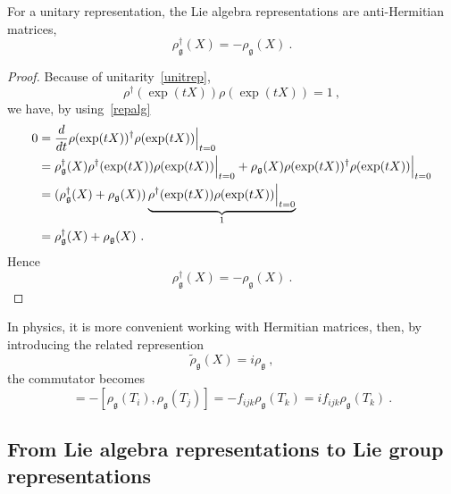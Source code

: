     For a unitary representation, the Lie algebra representations are anti-Hermitian matrices, 
    \begin{equation*}
        \rho_{\mathfrak g}^\dagger (X) = - \rho_{\mathfrak g} (X) ~.
    \end{equation*} 
    \begin{proof}
        Because of unitarity~\eqref{unitrep}, 
        \begin{equation*}
            \rho^\dagger(\exp(tX)) \rho(\exp(tX)) = 1 ~,
        \end{equation*} 
        we have, by using~\eqref{repalg}
        \begin{equation*}
        \begin{aligned}
            0 & = \frac{d}{dt} \rho(\exp(tX))^\dagger \rho(\exp(tX))\Big \vert_{t=0} \\ & = \rho^\dagger_{\mathfrak g} (X) \rho^\dagger (\exp(tX)) \rho(\exp(tX))\Big \vert_{t=0} + \rho_{\mathfrak g} (X) \rho(\exp(tX))^\dagger \rho(\exp(tX))\Big \vert_{t=0} \\ & = (\rho^\dagger_{\mathfrak g} (X) + \rho_{\mathfrak g} (X)) \underbrace{\rho^\dagger(\exp(tX)) \rho(\exp(tX))\Big \vert_{t=0}}_{1} \\ & = \rho_{\mathfrak g}^\dagger (X) + \rho_{\mathfrak g} (X) ~.
        \end{aligned}
        \end{equation*}
        Hence 
        \begin{equation*}
            \rho_{\mathfrak g}^\dagger (X) = - \rho_{\mathfrak g} (X) ~.
        \end{equation*}
    \end{proof}

    In physics, it is more convenient working with Hermitian matrices, then, by introducing the related represention 
    \begin{equation*}
        \tilde \rho_{\mathfrak g} (X) = i \rho_{\mathfrak g} ~,
    \end{equation*}
    the commutator becomes 
    \begin{equation*}
        [\tilde \rho_{\mathfrak g} (T_i), \tilde \rho_{\mathfrak g} (T_j)] = - [ \rho_{\mathfrak g} (T_i), \rho_{\mathfrak g} (T_j)] = - f_{ijk} \rho_{\mathfrak g} (T_k) = i f_{ijk} \rho_{\mathfrak g} (T_k) ~.
    \end{equation*}

\subsection{From Lie algebra representations to Lie group representations}

